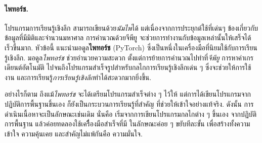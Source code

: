 %	
%	
%	
%	
%	
%	
%	





\paragraph{ไพทอร์ช.}
โปรแกรมการเรียนรู้เชิงลึก สามารถเขียนด้วย\textit{นัมไพ}ได้
แต่เนื่องจากการประยุกต์ใช้ที่เด่นๆ ข้องเกี่ยวกับข้อมูลที่มีมิติและจำนวนมหาศาล
การคำนวณด้วยจีพียู จะช่วยการทำงานกับข้อมูลเหล่านั้นให้เสร็จได้เร็วขึ้นมาก.
หัวข้อนี้ แนะนำมอดูล\textbf{ไพทอร์ช} (PyTorch) ซึ่งเป็นหนึ่งในเครื่องมือที่นิยมใช้กับการเรียนรู้เชิงลึก.
มอดูล\textit{ไพทอร์ช} ช่วยอำนวยความสะดวก ตั้งแต่การย้ายการคำนวณไปทำที่\textit{จีพียู}
การหาค่าเกรเดียนต์อัตโนมัติ ไปจนถึงโปรแกรมสำเร็จรูปสำหรับกลไกการเรียนรู้เชิงลึกเด่น ๆ
ซึ่งจะช่วยให้การใช้งาน และการเรียนรู้\textit{การเรียนรู้เชิงลึก}ทำได้สะดวกมากยิ่งขึ้น.

อย่างไรก็ตาม ถึงแม้\textit{ไพทอร์ช} จะได้เตรียมโปรแกรมสำเร็จต่าง ๆ ไว้ให้
แต่การได้เขียนโปรแกรมจากปฏิบัติการพื้นฐานขึ้นเอง ก็ยังเป็นกระบวนการเรียนรู้ที่สำคัญ
ที่ช่วยให้เข้าใจอย่างแท้จริง.
ดังนั้น การดำเนินเนื้อหาจะเป็นลักษณะเช่นเดิม นั่นคือ เริ่มจากการเขียนโปรแกรมกลไกต่าง ๆ ขึ้นเอง 
จากปฏิบัติการพื้นฐาน
แล้วค่อยทดลองใช้เครืื่องมือสำเร็จที่มี
ในลักษณะค่อย ๆ ขยับทีละขั้น เพื่อสร้างทั้งความเข้าใจ ความคุ้นเคย และสำคัญไม่แพ้กันคือ ความมั่นใจ.

